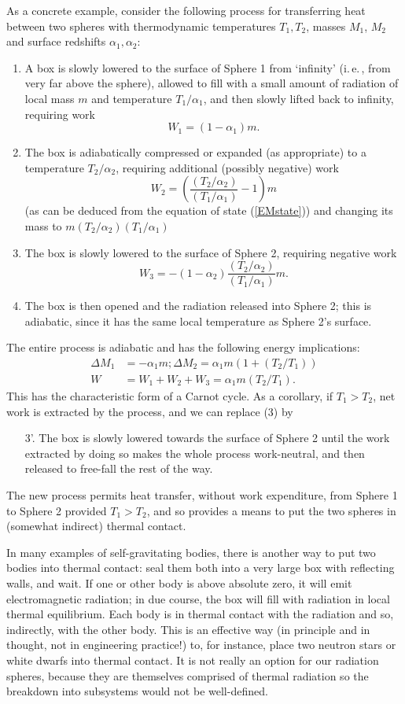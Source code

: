 \documentclass[12pt]{article}
\newcommand{\iec}{\mbox{i.\,e.\,}}
\newcommand{\be}{\begin{equation}}
\newcommand{\ee}{\end{equation}}
\begin{document}
As a concrete example, consider the following process for transferring heat between two spheres with thermodynamic temperatures $T_1,T_2$, masses $M_1$, $M_2$ and surface redshifts $\alpha_1,\alpha_2$:
\begin{enumerate}
\item A box is slowly lowered to the surface of Sphere 1 from `infinity' (\iec, from very far above the sphere), allowed to fill with a small amount of radiation of local mass $m$ and temperature $ T_1 / \alpha_1$, and then slowly lifted back to infinity, requiring  \cite{unruhwald1982} work 
\be W_1 = (1-\alpha_1 )m.\ee
\item The box is adiabatically compressed or expanded (as appropriate) to a temperature $T_2/\alpha_2$, requiring additional (possibly negative) work 
\be
W_2 = \left( \frac{(T_2/\alpha_2)}{(T_1/\alpha_1)} - 1\right)m
\ee 
(as can be deduced from the equation of state (\ref{EMstate})) and changing its mass to $m (T_2/\alpha_2)(T_1/\alpha_1)$
\item The box is slowly lowered to the surface of Sphere 2, requiring negative work
\be
W_3 = - (1-\alpha_2 ) \frac{(T_2/\alpha_2)}{(T_1/\alpha_1)}m.
\ee
\item The box is then opened and the radiation released into Sphere 2; this is adiabatic, since it has the same local temperature as Sphere 2's surface.
\end{enumerate}
The entire process is adiabatic and has the following energy implications:
\be
\begin{aligned}
\Delta M_1 &= - \alpha_1 m;  \Delta M_2 = \alpha_1 m (1 + (T_2/T_1)) \\
W &= W_1+W_2+W_3 = \alpha_1 m (T_2/T_1). 
\end{aligned}
\ee
This has the characteristic form of a Carnot cycle. As a corollary, if $T_1>T_2$, net work is extracted by the process, and we can replace (3) by
\begin{enumerate}
\item[3'.] The box is slowly lowered towards the surface of Sphere 2 until the work extracted by doing so makes the whole process work-neutral, and then released to free-fall the rest of the way.
\end{enumerate}
The new process permits heat transfer, without work expenditure, from Sphere 1 to Sphere 2 provided $T_1>T_2$, and so provides a means to put the two spheres in (somewhat indirect) thermal contact.

In many examples of self-gravitating bodies, there is another way to put two bodies into thermal contact: seal them both into a very large box with reflecting walls, and wait. If one or other body is above absolute zero, it will emit electromagnetic radiation; in due course, the box will fill with radiation in local thermal equilibrium. Each body is in thermal contact with the radiation and so, indirectly, with the other body. This is an effective way (in principle and in thought, not in engineering practice!) to, for instance, place two neutron stars or white dwarfs into thermal contact. It is not really an option for our radiation spheres, because they are themselves comprised of thermal radiation so the breakdown into subsystems would not be well-defined.
\end{document}
